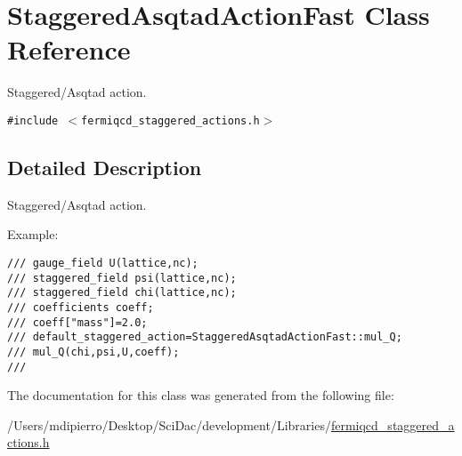 \hypertarget{class_staggered_asqtad_action_fast}{
\section{StaggeredAsqtadActionFast Class Reference}
\label{class_staggered_asqtad_action_fast}
}
Staggered/Asqtad action.  


{\tt \#include $<$fermiqcd\_\-staggered\_\-actions.h$>$}



\subsection{Detailed Description}
Staggered/Asqtad action. 

Example: 

\footnotesize\begin{verbatim}
/// gauge_field U(lattice,nc);
/// staggered_field psi(lattice,nc);
/// staggered_field chi(lattice,nc);
/// coefficients coeff;
/// coeff["mass"]=2.0;
/// default_staggered_action=StaggeredAsqtadActionFast::mul_Q;
/// mul_Q(chi,psi,U,coeff);
/// \end{verbatim}
\normalsize
 

The documentation for this class was generated from the following file:\begin{CompactItemize}
\item 
/Users/mdipierro/Desktop/SciDac/development/Libraries/\hyperlink{fermiqcd__staggered__actions_8h}{fermiqcd\_\-staggered\_\-actions.h}\end{CompactItemize}
